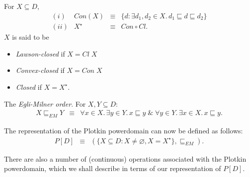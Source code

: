 \begin{definition}
{\rm For $X \subseteq D$,
\[ \begin{array}{rlcl}
(i) & Con(X) & \equiv & \{ d : \exists d_{1}, d_{2} \in X . \, d_{1} \sqsubseteq d \sqsubseteq d_{2} \} \\
(ii) & X^{\star} & \equiv & Con \circ Cl .
\end{array} \]
$X$ is said to be
\begin{itemize}
\item {\em Lawson-closed} if $X = Cl \; X$
\item {\em Convex-closed} if $X = Con \; X$
\item {\em Closed} if $X = X^{\star}$.
\end{itemize}}
\end{definition}

\begin{definition}
{\rm The {\em Egli-Milner order}. For $X, Y \subseteq D$:}
\begin{eqnarray*}
X \sqsubseteq_{EM} Y & \equiv & \forall x \in X . \, \exists y \in Y . \, x \sqsubseteq y \; \& \; \forall y \in Y . \, \exists x \in X . \, x \sqsubseteq y .
\end{eqnarray*}
\end{definition}

The representation of the Plotkin powerdomain can now be defined as follows:
\begin{eqnarray*}
P[D] & \equiv & ( \{ X \subseteq D : X \not= \varnothing , X = X^{\star} \} , \sqsubseteq_{EM} ) .
\end{eqnarray*}

There are also a number of (continuous) operations associated with the Plotkin powerdomain, which we shall describe in terms of our representation of $P[D]$.

